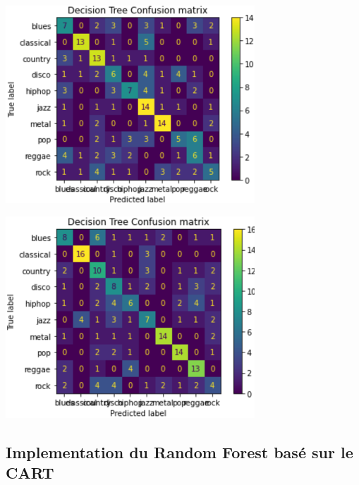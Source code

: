 \documentclass[10pt]{article}
\begin{document}
\begin{minipage}[t]{0.5\linewidth}

\includegraphics[width=0.7\textwidth]{DecisionTree-ConfusionMatrix.png}

\end{minipage}
\begin{minipage}[t]{0.5\linewidth}

\includegraphics[width=0.7\textwidth]{DecisionTree-ConfusionMatrix2.png}

\end{minipage}

\subsection{Implementation du Random Forest basé sur le CART}
\end{document}
